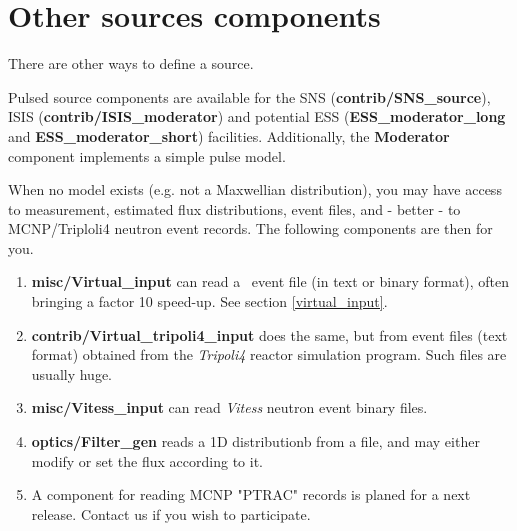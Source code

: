 \newpage


\newpage


\newpage


\newpage


\newpage


\newpage


\newpage


\newpage
\section{Other sources components}
\label{sources-seealso}

There are other ways to define a source.

Pulsed source components are available for the SNS ({\bf contrib/SNS\_source}), ISIS ({\bf contrib/ISIS\_moderator}) and potential ESS ({\bf ESS\_moderator\_long} and {\bf  ESS\_moderator\_short}) facilities. Additionally, the {\bf Moderator} component implements a simple pulse model.

When no model exists (e.g. not a Maxwellian distribution), you may have access to measurement, estimated flux distributions, event files, and - better - to MCNP/Triploli4 neutron event records. The following components are then for you.

\begin{enumerate}
\item{{\bf misc/Virtual\_input} can read a \MCS\ event file (in text or binary format), often bringing a factor 10 speed-up. See section \ref{virtual_input}.}
\item{{\bf contrib/Virtual\_tripoli4\_input} does the same, but from event files (text format) obtained from the \emph{Tripoli4} \cite{tripoli_webpage} reactor simulation program. Such files are usually huge.}
\item{{\bf misc/Vitess\_input} can read \emph{Vitess} \cite{vitess_webpage} neutron event binary files.}
\item{{\bf optics/Filter\_gen} reads a 1D distributionb from a file, and may either modify or set the flux according to it.}
\item{A component for reading MCNP "PTRAC" records is planed for a next release. Contact us if you wish to participate.}
\end{enumerate}
